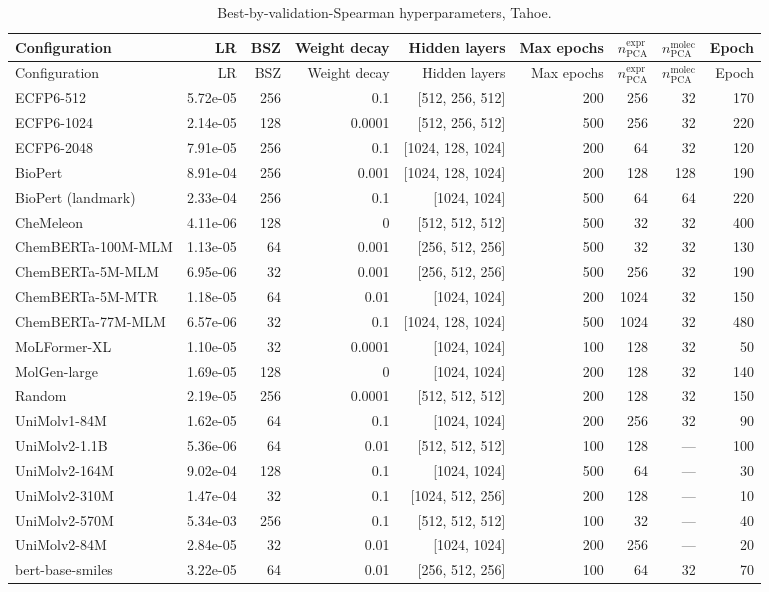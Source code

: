 \begin{longtable}{lrrrrrrrr}
\caption{Best-by-validation-Spearman hyperparameters, Tahoe.} \label{tab:hp_tahoe} \\
\toprule
Configuration & LR & BSZ & Weight decay & Hidden layers & Max epochs & $n_\mathrm{PCA}^{\mathrm{expr}}$ & $n_\mathrm{PCA}^{\mathrm{molec}}$ & Epoch \\
\midrule
\endfirsthead
\toprule
Configuration & LR & BSZ & Weight decay & Hidden layers & Max epochs & $n_\mathrm{PCA}^{\mathrm{expr}}$ & $n_\mathrm{PCA}^{\mathrm{molec}}$ & Epoch \\
\midrule
\endhead
\bottomrule
\endfoot
ECFP6-512 & 5.72e-05 & 256 & 0.1 & [512, 256, 512] & 200 & 256 & 32 & 170 \\
ECFP6-1024 & 2.14e-05 & 128 & 0.0001 & [512, 256, 512] & 500 & 256 & 32 & 220 \\
ECFP6-2048 & 7.91e-05 & 256 & 0.1 & [1024, 128, 1024] & 200 & 64 & 32 & 120 \\
BioPert & 8.91e-04 & 256 & 0.001 & [1024, 128, 1024] & 200 & 128 & 128 & 190 \\
BioPert (landmark) & 2.33e-04 & 256 & 0.1 & [1024, 1024] & 500 & 64 & 64 & 220 \\
CheMeleon & 4.11e-06 & 128 & 0 & [512, 512, 512] & 500 & 32 & 32 & 400 \\
ChemBERTa-100M-MLM & 1.13e-05 & 64 & 0.001 & [256, 512, 256] & 500 & 32 & 32 & 130 \\
ChemBERTa-5M-MLM & 6.95e-06 & 32 & 0.001 & [256, 512, 256] & 500 & 256 & 32 & 190 \\
ChemBERTa-5M-MTR & 1.18e-05 & 64 & 0.01 & [1024, 1024] & 200 & 1024 & 32 & 150 \\
ChemBERTa-77M-MLM & 6.57e-06 & 32 & 0.1 & [1024, 128, 1024] & 500 & 1024 & 32 & 480 \\
MoLFormer-XL & 1.10e-05 & 32 & 0.0001 & [1024, 1024] & 100 & 128 & 32 & 50 \\
MolGen-large & 1.69e-05 & 128 & 0 & [1024, 1024] & 200 & 128 & 32 & 140 \\
Random & 2.19e-05 & 256 & 0.0001 & [512, 512, 512] & 200 & 128 & 32 & 150 \\
UniMolv1-84M & 1.62e-05 & 64 & 0.1 & [1024, 1024] & 200 & 256 & 32 & 90 \\
UniMolv2-1.1B & 5.36e-06 & 64 & 0.01 & [512, 512, 512] & 100 & 128 & — & 100 \\
UniMolv2-164M & 9.02e-04 & 128 & 0.1 & [1024, 1024] & 500 & 64 & — & 30 \\
UniMolv2-310M & 1.47e-04 & 32 & 0.1 & [1024, 512, 256] & 200 & 128 & — & 10 \\
UniMolv2-570M & 5.34e-03 & 256 & 0.1 & [512, 512, 512] & 100 & 32 & — & 40 \\
UniMolv2-84M & 2.84e-05 & 32 & 0.01 & [1024, 1024] & 200 & 256 & — & 20 \\
bert-base-smiles & 3.22e-05 & 64 & 0.01 & [256, 512, 256] & 100 & 64 & 32 & 70 \\
\end{longtable}
